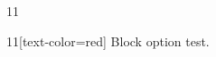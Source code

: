 \documentclass[paper=A4]{ropas-poster}
\begin{document}
\begin{postergrid}{1}{1}
\begin{posterblock}{1}{1}[text-color=red]
Block option test.
\end{posterblock}
\end{postergrid}
\end{document}
